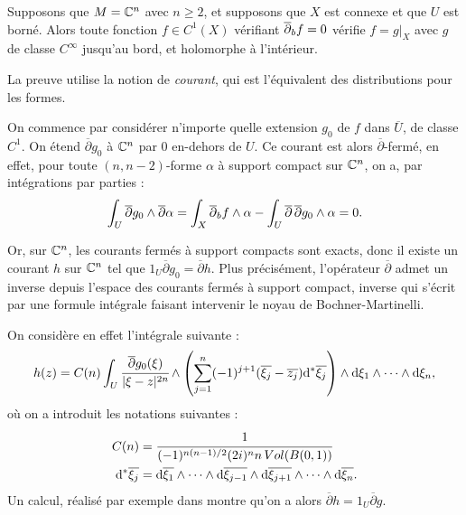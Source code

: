 \begin{prop}
	Supposons que $M=\mathbb{C}^n$ avec $n \geq 2$, et supposons que $X$ est connexe et que $U$ est borné. Alors toute fonction $f \in C^1(X)$ vérifiant $\overline{\partial}_b f =0$ vérifie $f = g|_X$ avec $g$ de classe $C^{\infty}$ jusqu'au bord, et holomorphe à l'intérieur.
\end{prop}
\begin{preuve}
	La preuve utilise la notion de \emph{courant}, qui est l'équivalent des distributions pour les formes.
	
	On commence par considérer n'importe quelle extension $g_0$ de $f$ dans $\overline{U}$, de classe $C^1$. On étend $\overline{\partial}g_0$ à $\mathbb{C}^n$ par $0$ en-dehors de $U$. Ce courant est alors $\overline{\partial}$-fermé, en effet, pour toute $(n,n-2)$-forme $\alpha$ à support compact sur $\mathbb{C}^n$, on a, par intégrations par parties :
	\begin{equation*}
		\int_U\overline{\partial}g_0 \wedge \overline{\partial}\alpha = \int_X\overline{\partial}_b f \wedge \alpha - \int_U\overline{\partial}\,\overline{\partial}g_0 \wedge \alpha = 0.
	\end{equation*}
	
	Or, sur $\mathbb{C}^n$, les courants fermés à support compacts sont exacts, donc il existe un courant $h$ sur $\mathbb{C}^n$ tel que $1_U\overline{\partial}g_0 = \overline{\partial}h$. Plus précisément, l'opérateur $\overline{\partial}$ admet un inverse depuis l'espace des courants fermés à support compact, inverse qui s'écrit par une formule intégrale faisant intervenir le noyau de Bochner-Martinelli.
	
	On considère en effet l'intégrale suivante :
	\begin{equation*}
		h(z) = C(n)\int_U\cfrac{\overline{\partial}g_0(\xi)}{|\xi-z|^{2n}}\wedge \left(\sum_{j=1}^n(-1)^{j+1}(\overline{\xi_j}-\overline{z_j}) \mathrm{d}^* \overline{\xi_j}\right)\wedge \mathrm{d}\xi_1 \wedge \cdots \wedge \mathrm{d} \xi_n,
	\end{equation*}
	où on a introduit les notations suivantes :
	\begin{align*}
		C(n) &= \cfrac{1}{(-1)^{n(n-1)/2}(2i)^nn\,Vol(B(0,1))}\\
		\mathrm{d}^* \overline{\xi_j} &= \mathrm{d} \overline{\xi_1}\wedge \cdots \wedge \mathrm{d} \overline{\xi_{j-1}} \wedge \mathrm{d} \overline{\xi_{j+1}} \wedge \cdots \wedge \mathrm{d} \overline{\xi_{n}}.
	\end{align*}
	Un calcul, réalisé par exemple dans \cite{krantz2013geometric} montre qu'on a alors $\overline{\partial}h = 1_U\overline{\partial}g$.
	

\end{preuve}
